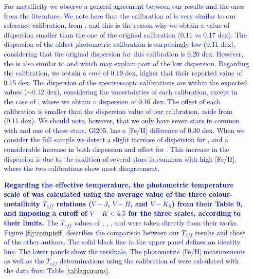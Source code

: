 \documentclass{aa}
\begin{document}
\textcolor{blue}{For metallicity we observe a general agreement between our results and the ones from the literature. We note here that the calibration of \citet{Schlaufman-2010} is very similar to our reference calibration, from \citet{Neves-2012}, and this is the reason why we obtain a value of dispersion smaller than the one of the original calibration (0.11 vs 0.17 dex). The dispersion of the oldest photometric calibration \citep{Bonfils-2005} is surprisingly low (0.11 dex), considering that the original dispersion for this calibration is 0.20 dex. However, the \citet{Bonfils-2005} is also similar to \citet{Schlaufman-2010} and \citet{Neves-2012} which may explain part of the low dispersion. Regarding the \citet{Johnson-2012} calibration, we obtain a $rms$ of 0.19 dex, higher that their reported value of 0.15 dex. The dispersion of the spectroscopic calibrations are within the expected values ($\sim$0.12 dex), considering the uncertainties of each calibration, except in the case of \citet{Mann-2013b}, where we obtain a dispersion of 0.16 dex. The offset of each calibration is smaller than the dispersion value of our calibration, aside from \citet{Mann-2013b} (0.11 dex). We should note, however, that we only have seven stars in common with \citet{Mann-2013b} and one of these stars, Gl205, has a [Fe/H] difference of 0.30 dex. When we consider the full sample we detect a slight increase of dispersion for \citet{Rojas-Ayala-2012}, and a considerable increase in both dispersion and offset for \citet{Newton-2013}. This increase in the \citet{Newton-2013} dispersion is due to the addition of several stars in common with high [Fe/H], where the two calibrations show most disagreement.}  %

\textcolor{blue}{\textbf{Regarding the effective temperature, the photometric temperature scale of \citet{Boyajian-2012} was calculated using the average value of the three colour-metallicity $T_{eff}$ relations ($V-J$, $V-H$, and $V-K_{S}$) from their Table 9, and imposing a cutoff of $V-K < 4.5$ for the three scales, according to their limits.}  %
\textcolor{blue}{The $T_{eff}$ values of \citet{Rojas-Ayala-2012}, \citet{Onehag-2012}, \citet{Mann-2013a}, and \citet{Rajpurohit-2013a} were taken directly from their works. Figure \ref{fig:compteff} describes the comparison between our $T_{eff}$ results and those of the other authors. The solid black line in the upper panel defines an identity line. The lower panels show the residuals.} %
The photometric [Fe/H] measurements as well as the $T_{eff}$ determinations using the calibration of \citet{Boyajian-2012} were calculated with the data from Table \ref{table:params}. 
}
\end{document}
